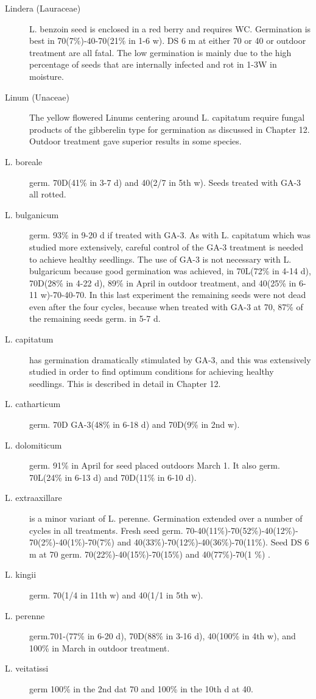 \begin{description}
\item[Lindera (Lauraceae)] L. benzoin seed is enclosed in a red berry and
requires WC. Germination is best in 70(7\%)-40-70(21\% in 1-6 w). DS 6 m at either 70
or 40 or outdoor treatment are all fatal. The low germination is mainly due to the high
percentage of seeds that are internally infected and rot in 1-3W in moisture.
\item[Linum (Unaceae)] The yellow flowered Linums centering around L.
capitatum require fungal products of the gibberelin type for germination as discussed
in Chapter 12. Outdoor treatment gave superior results in some species.
\item[L. boreale] germ. 70D(41\% in 3-7 d) and 40(2/7 in 5th w). Seeds treated with
GA-3 all rotted.
\item[L. bulganicum] germ. 93\% in 9-20 d if treated with GA-3. As with L. capitatum
which was studied more extensively, careful control of the GA-3 treatment is needed to
achieve healthy seedlings. The use of GA-3 is not necessary with L. bulgaricum
because good germination was achieved, in 70L(72\% in 4-14 d), 70D(28\% in 4-22 d),
89\% in April in outdoor treatment, and 40(25\% in 6-11 w)-70-40-70. In this last
experiment the remaining seeds were not dead even after the four cycles, because
when treated with GA-3 at 70, 87\% of the remaining seeds germ. in 5-7 d.
\item[L. capitatum] has germination dramatically stimulated by GA-3, and this was
extensively studied in order to find optimum conditions for achieving healthy
seedlings. This is described in detail in Chapter 12.
\item[L. catharticum] germ. 70D GA-3(48\% in 6-18 d) and 70D(9\% in 2nd w).
\item[L. dolomiticum] germ. 91\% in April for seed placed outdoors March 1. It also
germ. 70L(24\% in 6-13 d) and 70D(11\% in 6-10 d).
\item[L. extraaxillare] is a minor variant of L. perenne. Germination extended over a
number of cycles in all treatments. Fresh seed germ. 70-40(11\%)-70(52\%)-40(12\%)-
70(2\%)-40(1\%)-70(7\%) and 40(33\%)-70(12\%)-40(36\%)-70(11\%). Seed DS 6 m at 70
germ. 70(22\%)-40(15\%)-70(15\%) and 40(77\%)-70(1 \%) .
\item[L. kingii] germ. 70(1/4 in 11th w) and 40(1/1 in 5th w).
\item[L. perenne] germ.701-(77\% in 6-20 d), 70D(88\% in 3-16 d), 40(100\% in 4th w),
and 100\% in March in outdoor treatment.
\item[L. veitatissi] germ 100\% in the 2nd dat 70 and 100\% in the 10th d at 40.


\end{description}
